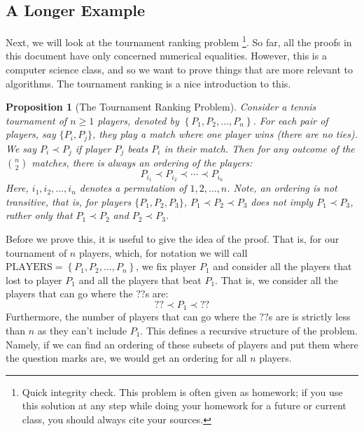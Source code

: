 \documentclass{article}
\theoremstyle{plain}
\newtheorem{proposition}{Proposition}
\theoremstyle{definition}
\begin{document}
\subsection{A Longer Example}

Next, we will look at the tournament ranking problem 
\footnote{Quick integrity check. This problem is often given as homework; if you use this solution at any step while doing your homework for a future or current class, you should always cite your sources.}.
So far, all the proofs in this document have only concerned numerical equalities. However, this is a computer science class, and so we want to prove things that are more relevant to algorithms. The tournament ranking is a nice introduction to this.

\begin{proposition}[The Tournament Ranking Problem]
    Consider a tennis tournament of \(n \geq 1\) players, denoted by \(\left\{P_1, P_2, \dotsc, P_n\right\}\). For each pair of players, say \(\{P_i, P_j\}\), they play a match where one player wins (there are no ties). We say \(P_i \prec P_j\) if player \(P_j\) beats \(P_i\) in their match. Then for any outcome of the \(\binom{n}{2}\) matches, there is always an ordering of the players:
    \[P_{i_1} \prec P_{i_2} \prec \cdots \prec P_{i_n}\]
    Here, \(i_1, i_2, \dotsc, i_n\) denotes a permutation of \(1, 2, \dotsc, n\). Note, an ordering is \emph{not} transitive, that is, for players \(\{P_1, P_2, P_3\}\), \(P_1 \prec P_2 \prec P_3\) does \emph{not} imply \(P_1 \prec P_3\), rather only that \(P_1 \prec P_2\) and \(P_2 \prec P_3\).
\end{proposition}

\vspace{0.1in}

Before we prove this, it is useful to give the idea of the proof. That is, for our tournament of \(n\) players, which, for notation we will call \(\text{PLAYERS} = \left\{P_1, P_2, \dotsc, P_n\right\}\), we fix player \(P_1\) and consider all the players that lost to player \(P_1\) and all the players that beat \(P_1\). That is, we consider all the players that can go where the \(??\)s are:
\[?? \prec P_1 \prec ??\]
Furthermore, the number of players that can go where the \(??\)s are is strictly less than \(n\) as they can't include \(P_1\). This defines a recursive structure of the problem. Namely, if we can find an ordering of these subsets of players and put them where the question marks are, we would get an ordering for all \(n\) players.
\end{document}
